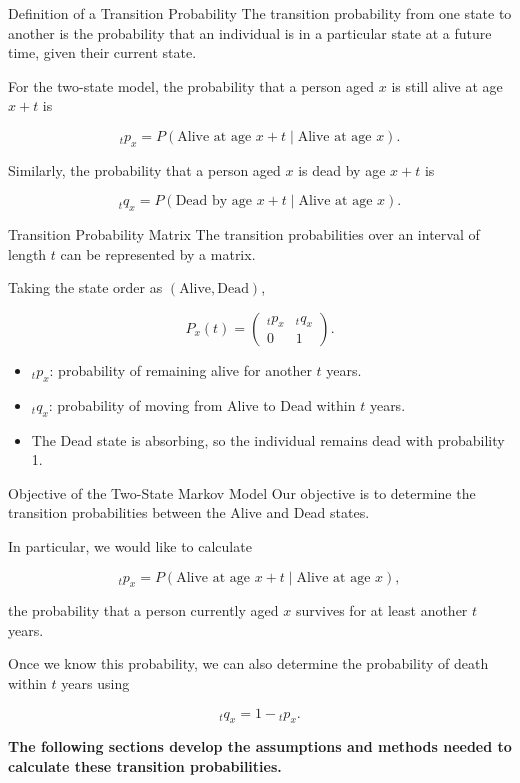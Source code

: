 \documentclass[
  ignorenonframetext,
  aspectratio=169,
]{beamer}
\providecommand{\tightlist}{%
  \setlength{\itemsep}{0pt}\setlength{\parskip}{0pt}}
\begin{document}
\begin{frame}{Definition of a Transition Probability}
\protect{}\label{definition-of-a-transition-probability}
The transition probability from one state to another is the probability
that an individual is in a particular state at a future time, given
their current state.

For the two-state model, the probability that a person aged \(x\) is
still alive at age \(x+t\) is

\[
{}_tp_x
=
P(\text{Alive at age }x+t
\mid
\text{Alive at age }x).
\]

Similarly, the probability that a person aged \(x\) is dead by age
\(x+t\) is

\[
{}_tq_x
=
P(\text{Dead by age }x+t
\mid
\text{Alive at age }x).
\]
\end{frame}

\begin{frame}{Transition Probability Matrix}
\protect{}\label{transition-probability-matrix}
The transition probabilities over an interval of length \(t\) can be
represented by a matrix.

Taking the state order as \((\text{Alive},\text{Dead})\),

\[
P_x(t)=
\begin{pmatrix}
{}_tp_x & {}_tq_x\\
0 & 1
\end{pmatrix}.
\]

\begin{itemize}
\tightlist
\item
  \({}_tp_x\): probability of remaining alive for another \(t\) years.
\item
  \({}_tq_x\): probability of moving from Alive to Dead within \(t\)
  years.
\item
  The Dead state is absorbing, so the individual remains dead with
  probability 1.
\end{itemize}
\end{frame}

\begin{frame}{Objective of the Two-State Markov Model}
\protect{}\label{objective-of-the-two-state-markov-model}
Our objective is to determine the transition probabilities between the
Alive and Dead states.

In particular, we would like to calculate

\[
{}_tp_x
=
P(\text{Alive at age }x+t
\mid
\text{Alive at age }x),
\]

the probability that a person currently aged \(x\) survives for at least
another \(t\) years.

Once we know this probability, we can also determine the probability of
death within \(t\) years using

\[
{}_tq_x=1-{}_tp_x.
\]

\textbf{The following sections develop the assumptions and methods
needed to calculate these transition probabilities.}
\end{frame}
\end{document}
